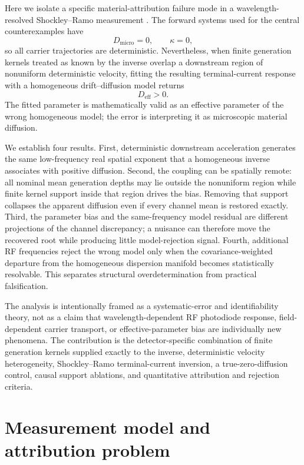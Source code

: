 \documentclass[aps,pra,twocolumn,superscriptaddress,nofootinbib]{revtex4-2}
\newcommand{\Deff}{D_{\mathrm{eff}}}
\newcommand{\Dmicro}{D_{\mathrm{micro}}}
\begin{document}
Here we isolate a specific material-attribution failure mode in a wavelength-resolved Shockley--Ramo measurement \cite{shockley1938,ramo1939}. The forward systems used for the central counterexamples have
\begin{equation}
\Dmicro=0,
\qquad
\kappa=0,
\end{equation}
so all carrier trajectories are deterministic. Nevertheless, when finite generation kernels treated as known by the inverse overlap a downstream region of nonuniform deterministic velocity, fitting the resulting terminal-current response with a homogeneous drift--diffusion model returns
\begin{equation}
\Deff>0.
\end{equation}
The fitted parameter is mathematically valid as an effective parameter of the wrong homogeneous model; the error is interpreting it as microscopic material diffusion.

We establish four results. First, deterministic downstream acceleration generates the same low-frequency real spatial exponent that a homogeneous inverse associates with positive diffusion. Second, the coupling can be spatially remote: all nominal mean generation depths may lie outside the nonuniform region while finite kernel support inside that region drives the bias. Removing that support collapses the apparent diffusion even if every channel mean is restored exactly. Third, the parameter bias and the same-frequency model residual are different projections of the channel discrepancy; a nuisance can therefore move the recovered root while producing little model-rejection signal. Fourth, additional RF frequencies reject the wrong model only when the covariance-weighted departure from the homogeneous dispersion manifold becomes statistically resolvable. This separates structural overdetermination from practical falsification.

The analysis is intentionally framed as a systematic-error and identifiability theory, not as a claim that wavelength-dependent RF photodiode response, field-dependent carrier transport, or effective-parameter bias are individually new phenomena. The contribution is the detector-specific combination of finite generation kernels supplied exactly to the inverse, deterministic velocity heterogeneity, Shockley--Ramo terminal-current inversion, a true-zero-diffusion control, causal support ablations, and quantitative attribution and rejection criteria.

\section{Measurement model and attribution problem}
\label{sec:model}
\end{document}
